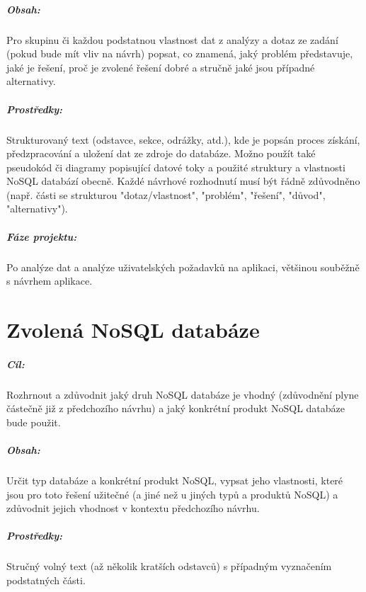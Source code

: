 \documentclass[10pt,xcolor=pdflatex,dvipsnames,table,oneside]{book}
\begin{document}
\paragraph{Obsah:}
Pro skupinu či každou podstatnou vlastnost dat z analýzy a dotaz ze zadání (pokud bude mít vliv na návrh) popsat,
co znamená, jaký problém představuje, jaké je řešení, proč je zvolené řešení dobré a stručně jaké jsou případné alternativy.

\paragraph{Prostředky:}
Strukturovaný text (odstavce, sekce, odrážky, atd.), kde je popsán proces získání, předzpracování a uložení dat ze zdroje do databáze.
Možno použít také pseudokód či diagramy popisující datové toky a použité struktury a vlastnosti NoSQL databází obecně.
Každé návrhové rozhodnutí musí být řádně zdůvodněno (např. části se strukturou "dotaz/vlastnost", "problém", "řešení", "důvod", "alternativy").

\paragraph{Fáze projektu:}
Po analýze dat a analýze uživatelských požadavků na aplikaci, většinou souběžně s návrhem aplikace.

\chapter{Zvolená NoSQL databáze}

\paragraph{Cíl:}
Rozhrnout a zdůvodnit jaký druh NoSQL databáze je vhodný (zdůvodnění plyne částečně již z předchozího návrhu) a jaký konkrétní produkt NoSQL databáze bude použit.

\paragraph{Obsah:}
Určit typ databáze a konkrétní produkt NoSQL, vypsat jeho vlastnosti,
které jsou pro toto řešení užitečné (a jiné než u jiných typů a produktů NoSQL)
a zdůvodnit jejich vhodnost v kontextu předchozího návrhu.

\paragraph{Prostředky:}
Stručný volný text (až několik kratších odstavců) s případným vyznačením podstatných části.
\end{document}
